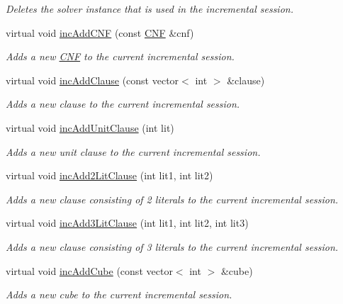 \begin{DoxyCompactItemize}
\begin{DoxyCompactList}\small\item\em Deletes the solver instance that is used in the incremental session. \end{DoxyCompactList}\item 
virtual void \hyperlink{classLingelingApi_ae9e54e64007c98add90e142a5c38d4bc}{inc\-Add\-C\-N\-F} (const \hyperlink{classCNF}{C\-N\-F} \&cnf)
\begin{DoxyCompactList}\small\item\em Adds a new \hyperlink{classCNF}{C\-N\-F} to the current incremental session. \end{DoxyCompactList}\item 
virtual void \hyperlink{classLingelingApi_afb3e0d0ab541b89ef6c281145f53105f}{inc\-Add\-Clause} (const vector$<$ int $>$ \&clause)
\begin{DoxyCompactList}\small\item\em Adds a new clause to the current incremental session. \end{DoxyCompactList}\item 
virtual void \hyperlink{classLingelingApi_aa5c928ad16d2dc79d42b977237d377e0}{inc\-Add\-Unit\-Clause} (int lit)
\begin{DoxyCompactList}\small\item\em Adds a new unit clause to the current incremental session. \end{DoxyCompactList}\item 
virtual void \hyperlink{classLingelingApi_a54bf3198e6bb2dd3ebda768272337955}{inc\-Add2\-Lit\-Clause} (int lit1, int lit2)
\begin{DoxyCompactList}\small\item\em Adds a new clause consisting of 2 literals to the current incremental session. \end{DoxyCompactList}\item 
virtual void \hyperlink{classLingelingApi_ad05f795bbf472fe5386164a74a8ecd86}{inc\-Add3\-Lit\-Clause} (int lit1, int lit2, int lit3)
\begin{DoxyCompactList}\small\item\em Adds a new clause consisting of 3 literals to the current incremental session. \end{DoxyCompactList}\item 
virtual void \hyperlink{classLingelingApi_a6dc0eb0582d6afda381fc05a5820433c}{inc\-Add\-Cube} (const vector$<$ int $>$ \&cube)
\begin{DoxyCompactList}\small\item\em Adds a new cube to the current incremental session. \end{DoxyCompactList}\item 

\end{DoxyCompactItemize}
